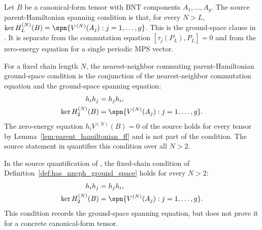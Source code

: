 \begin{definition}%
    \label{def:parent_hamiltonian_ground_space_spanning}
    \leanok
    Let $B$ be a canonical-form tensor with BNT components
    $A_1,\ldots,A_g$. The source parent-Hamiltonian spanning condition is that,
    for every $N>L$,
    $\ker H_L^{(N)}(B)=\spn\{V^{(N)}(A_j):j=1,\ldots,g\}$.
    This is the ground-space clause in
    \cite[Definition~3.9]{Cirac2016MPDO_arXiv}. It is separate from the
    commutation equation $[\tau_j(P_L),P_L]=0$ and from the zero-energy
    equation for a single periodic MPS vector.
\end{definition}

\begin{definition}%
    \label{def:has_nncph_ground_space}
    \leanok
    For a fixed chain length $N$, the nearest-neighbor commuting
    parent-Hamiltonian ground-space condition is the conjunction of the
    nearest-neighbor commutation equation and the ground-space spanning
    equation:
    \begin{align}
        h_i h_j & =h_j h_i,
        \notag              \\
        \ker H_2^{(N)}(B)
                & =
        \spn\{V^{(N)}(A_j):j=1,\ldots,g\}.
        \notag
    \end{align}
    The zero-energy equation $h_iV^{(N)}(B)=0$ of the source holds for every
    tensor by Lemma~\ref{lem:parent_hamiltonian_ff} and is not part of the
    condition. The source statement in
    \cite[Theorem~3.10(iii)]{Cirac2016MPDO_arXiv} quantifies this condition
    over all $N>2$.
\end{definition}

\begin{definition}%
    \label{def:has_nncph_ground_spaces}
    \leanok
    In the source quantification of
    \cite[Theorem~3.10(iii)]{Cirac2016MPDO_arXiv}, the fixed-chain condition
    of Definition~\ref{def:has_nncph_ground_space} holds for every $N>2$:
    \begin{align}
        h_i h_j & =h_j h_i,
        \notag              \\
        \ker H_2^{(N)}(B)
                & =
        \spn\{V^{(N)}(A_j):j=1,\ldots,g\}.
        \notag
    \end{align}
    This condition records the ground-space spanning equation, but does not
    prove it for a concrete canonical-form tensor.
\end{definition}

